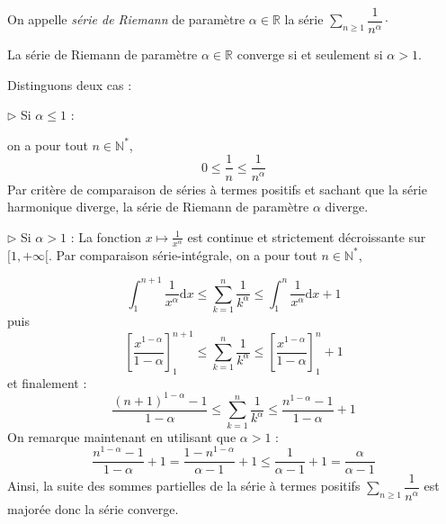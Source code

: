 \documentclass[french,11pt,twoside]{VcCours}
\newcommand{\dx}{\text{d}x}
\newcommand{\Sum}[2]{\ensuremath{\textstyle{\sum\limits_{#1}^{#2}}}}
\begin{document}
\begin{Definition}{}
On appelle \emph{série de Riemann} de paramètre $\alpha \in \mathbb{R}$ la série $\Sum{n \geq 1}{} \dfrac{1}{n^{\alpha}} \cdot$
\end{Definition}

\begin{Theoreme}{}
La série de Riemann de paramètre $\alpha \in \mathbb{R}$ converge si et seulement si $\alpha >1$.
\end{Theoreme}

\begin{Demonstration}{} Distinguons deux cas :

$\rhd$ Si $\alpha \leq 1$ :

on a pour tout $n \in \mathbb{N}^*$,
$$ 0 \leq \frac{1}{n} \leq \frac{1}{n^{\alpha}}$$
Par critère de comparaison de séries à termes positifs et sachant que la série harmonique diverge, la série de Riemann de paramètre $\alpha$ diverge.

\medskip



$\rhd$ Si $\alpha>1$ :
La fonction $x \mapsto \frac{1}{x^{\alpha}}$ est continue et strictement décroissante sur $[1, + \infty[$. Par comparaison série-intégrale, on a pour tout $n \in \mathbb{N}^*$,

$$\int_{1}^{n+1} \frac{1}{x^{\alpha}} \dx \leq \sum_{k=1}^n \frac{1}{k^{\alpha}} \leq \int_{1}^{n} \frac{1}{x^{\alpha}} \dx +1$$
puis 
$$ \left[ \frac{x^{1-\alpha}}{1- \alpha} \right]_1^{n+1}  \leq \sum_{k=1}^n \frac{1}{k^{\alpha}} \leq  \left[ \frac{x^{1-\alpha}}{1- \alpha} \right]_1^{n} + 1 $$
et finalement :
\begin{equation}\label{SerieRiemann}
\frac{(n+1)^{1-\alpha}-1}{1 - \alpha} \leq \sum_{k=1}^n \frac{1}{k^{\alpha}} \leq   \frac{n^{1-\alpha}-1}{1 - \alpha} + 1
\end{equation}
On remarque maintenant en utilisant que $\alpha>1$ :
$$ \frac{n^{1-\alpha}-1}{1 - \alpha} + 1 = \frac{1-n^{1-\alpha}}{\alpha-1} + 1 \leq \frac{1}{\alpha-1} + 1 = \frac{\alpha}{\alpha-1}$$
Ainsi, la suite des sommes partielles de la série à termes positifs $\Sum{n \geq 1}{} \dfrac{1}{n^{\alpha}}$ est majorée donc la série converge.

\vspace*{8cm}

$\phantom{test}$ 

\vspace*{7cm}
\end{Demonstration}
\end{document}
